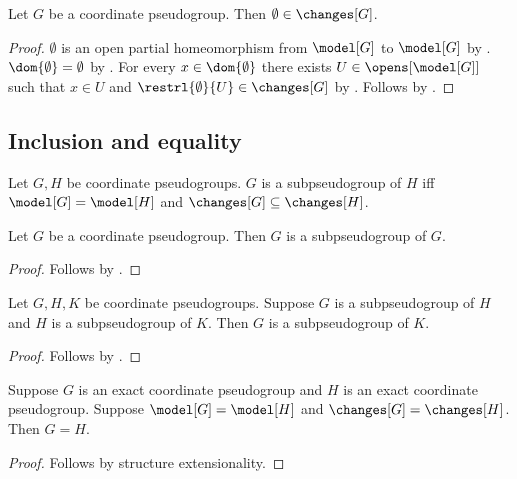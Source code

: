 \begin{theorem}\label{pseudogroup_empty_change}
    Let $G$ be a coordinate pseudogroup.
    Then $\emptyset\in\changes[G]$.
\end{theorem}
\begin{proof}
    $\emptyset$ is an open partial homeomorphism from $\model[G]$ to $\model[G]$
        by .
    $\dom{\emptyset}=\emptyset$ by .
    For every $x\in\dom{\emptyset}$ there exists $U\in\opens[\model[G]]$
        such that $x\in U$ and $\restrl{\emptyset}{U}\in\changes[G]$
        by \auto.
    Follows by .
\end{proof}

\subsection{Inclusion and equality}

\begin{definition}\label{subpseudogroup}
    Let $G,H$ be coordinate pseudogroups.
    $G$ is a subpseudogroup of $H$ iff
        $\model[G]=\model[H]$ and $\changes[G]\subseteq\changes[H]$.
\end{definition}

\begin{classification}\label{subpseudogroup_reflexive}
    Let $G$ be a coordinate pseudogroup.
    Then $G$ is a subpseudogroup of $G$.
\end{classification}
\begin{proof}
    Follows by .
\end{proof}

\begin{classification}\label{subpseudogroup_transitive}
    Let $G,H,K$ be coordinate pseudogroups.
    Suppose $G$ is a subpseudogroup of $H$ and $H$ is a subpseudogroup of $K$.
    Then $G$ is a subpseudogroup of $K$.
\end{classification}
\begin{proof}
    Follows by .
\end{proof}

\begin{theorem}\label{exact_coordinate_pseudogroup_extensionality}
    Suppose $G$ is an exact coordinate pseudogroup and
        $H$ is an exact coordinate pseudogroup.
    Suppose $\model[G]=\model[H]$ and $\changes[G]=\changes[H]$.
    Then $G=H$.
\end{theorem}
\begin{proof}
    Follows by structure extensionality.
\end{proof}

